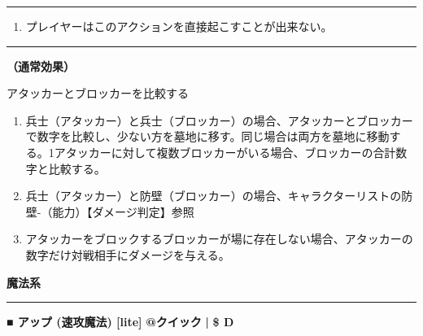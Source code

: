 \documentclass[twocolumn,a5paper,papersize,10pt]{jarticle}
\begin{document}
\vspace{1mm}%
\hrule height 0.1mm depth 0mm width 66.5mm %
\vspace{1mm}%


\vspace{-1zh}%
\begin{enumerate}
\renewcommand{\labelenumi}{※}
\setlength{\leftskip}{-0.3cm}
\setlength{\itemsep}{0pt} %
\setlength{\parskip}{0pt} %

\item プレイヤーはこのアクションを直接起こすことが出来ない。

\vspace{-3mm}%
\end{enumerate}
\vspace{1mm}%
\hrule height 0.1mm depth 0mm width 66.5mm %
\vspace{1mm}%

{\bf（通常効果）}

アタッカーとブロッカーを比較する


\vspace{-1zh}%
\begin{enumerate}
\setlength{\leftskip}{-0.3cm}
\setlength{\parskip}{0pt} %

\item 兵士（アタッカー）と兵士（ブロッカー）の場合、アタッカーとブロッカーで数字を比較し、少ない方を墓地に移す。同じ場合は両方を墓地に移動する。1アタッカーに対して複数ブロッカーがいる場合、ブロッカーの合計数字と比較する。

\item 兵士（アタッカー）と防壁（ブロッカー）の場合、キャラクターリストの防壁-（能力）【ダメージ判定】参照

\item アタッカーをブロックするブロッカーが場に存在しない場合、アタッカーの数字だけ対戦相手にダメージを与える。
\vspace{-1zh}%
\end{enumerate}


\begin{tcolorbox}
{\scriptsize\bf 魔法系}
\end{tcolorbox}
\vspace{-1zh}%
\vspace{2mm} %
\hrule height 0.5mm depth 0mm width 66.5mm %
\vspace{1mm} %
{\normalsize\bf ■ アップ {\scriptsize (速攻魔法) [lite]}} %
\hfill 
{\small\bf @クイック }
  {\small\bf | } {\small\bf \$ D}
\end{document}
